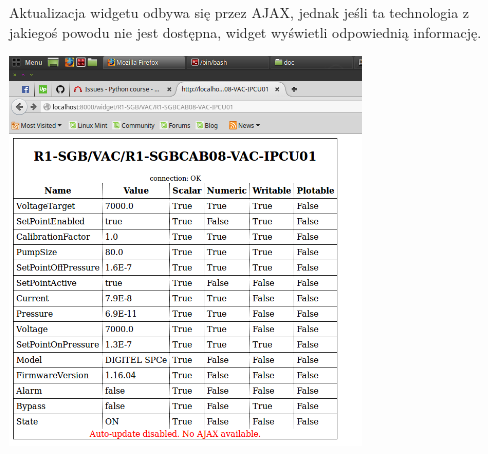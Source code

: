 \documentclass[12pt,a4paper]{article}
\begin{document}
Aktualizacja widgetu odbywa się przez AJAX, jednak jeśli ta technologia z jakiegoś powodu nie jest dostępna, widget wyświetli odpowiednią informację.
\begin{center}
\includegraphics[width=0.7\textwidth]{./no_ajax.png}
\end{center}
\end{document}
